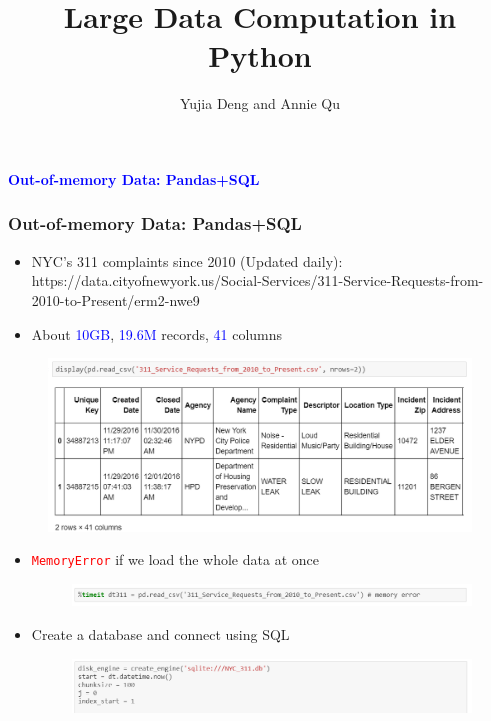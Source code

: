 \documentclass[red]{beamer}
\title{Large Data Computation in Python}
\author{Yujia Deng and Annie Qu}
\institute[UIUC] %
{
University of Illinois at Urbana-Champaign}
\date{}
\begin{document}
\begin{frame}
  \titlepage
\end{frame}

\begin{frame}
\centering
\LARGE \textcolor{blue}{\textbf{Out-of-memory Data: Pandas+SQL}}
\end{frame}

\begin{frame}
\frametitle{Out-of-memory Data: Pandas+SQL}
\begin{itemize}
	\item NYC's 311 complaints since 2010 (Updated daily): https://data.cityofnewyork.us/Social-Services/311-Service-Requests-from-2010-to-Present/erm2-nwe9
	
	
	\item About \textcolor{blue}{10GB}, \textcolor{blue}{19.6M} records, \textcolor{blue}{41} columns
\end{itemize}
\vspace{-5mm}
\begin{figure}
	\centering
	\includegraphics[width=1\linewidth]{figure/screenshot001}
\end{figure}
\end{frame}

\begin{frame}
\begin{itemize}
	\item \textcolor{red}{\texttt{MemoryError}} if we load the whole data at once
	\begin{figure}
		\centering
		\includegraphics[width=1\linewidth]{figure/screenshot002}
	\end{figure}

	\vspace{3mm}
	\item Create a database and connect using SQL
	\begin{figure}
		\centering
		\includegraphics[width=1\linewidth]{figure/screenshot003}
	\end{figure}
\end{itemize}
\end{frame}
\end{document}
